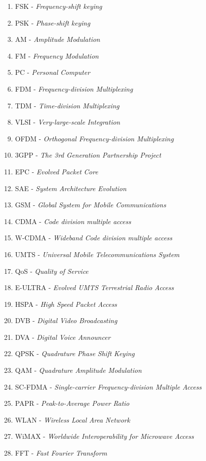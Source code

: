 \begin{enumerate}
	\item FSK - \textit{Frequency-shift keying}
	\item PSK - \textit{Phase-shift keying}
	\item AM - \textit{Amplitude Modulation}
	\item FM - \textit{Frequency Modulation}
	\item PC - \textit{Personal Computer}
	\item FDM - \textit{Frequency-division Multiplexing}
	\item TDM - \textit{Time-division Multiplexing}
	\item VLSI - \textit{Very-large-scale Integration}
	\item OFDM - \textit{Orthogonal Frequency-division Multiplexing}
	\item 3GPP - \textit{The 3rd Generation Partnership Project}
	\item EPC - \textit{Evolved Packet Core}
	\item SAE - \textit{System Architecture Evolution}
	\item GSM - \textit{Global System for Mobile Communications}
	\item CDMA - \textit{Code division multiple access}
	\item W-CDMA - \textit{Wideband Code division multiple access}
	\item UMTS - \textit{Universal Mobile Telecommunications System}
	\item QoS - \textit{Quality of Service}
	\item E-ULTRA - \textit{Evolved UMTS Terrestrial Radio Access}
	\item HSPA - \textit{High Speed Packet Access}
	\item DVB - \textit{Digital Video Broadcasting}
	\item DVA - \textit{Digital Voice Announcer}
	\item QPSK - \textit{Quadrature Phase Shift Keying}
	\item QAM - \textit{Quadrature Amplitude Modulation}
	\item SC-FDMA - \textit{Single-carrier Frequency-division Multiple Access}
	\item PAPR - \textit{Peak-to-Average Power Ratio}
	\item WLAN - \textit{Wireless Local Area Network}
	\item WiMAX - \textit{Worldwide Interoperability for Microwave Access}
	\item FFT - \textit{Fast Fourier Transform}

\end{enumerate}

